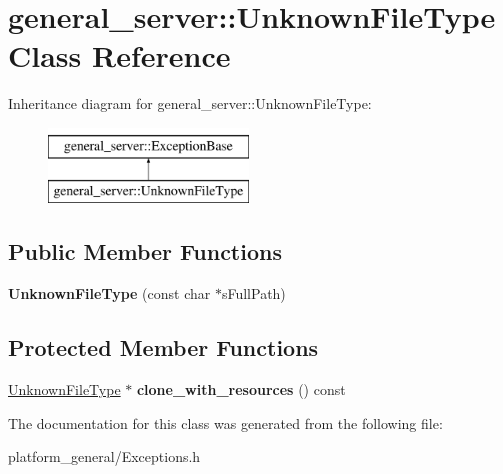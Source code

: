 \hypertarget{classgeneral__server_1_1UnknownFileType}{\section{general\-\_\-server\-:\-:\-Unknown\-File\-Type \-Class \-Reference}
\label{classgeneral__server_1_1UnknownFileType}
}
\-Inheritance diagram for general\-\_\-server\-:\-:\-Unknown\-File\-Type\-:\begin{figure}[H]
\begin{center}
\leavevmode
\includegraphics[height=2.000000cm]{classgeneral__server_1_1UnknownFileType}
\end{center}
\end{figure}
\subsection*{\-Public \-Member \-Functions}
\begin{DoxyCompactItemize}
\item 
\hypertarget{classgeneral__server_1_1UnknownFileType_ad2e335594ff561dd2b3affd301761854}{{\bfseries \-Unknown\-File\-Type} (const char $\ast$s\-Full\-Path)}\label{classgeneral__server_1_1UnknownFileType_ad2e335594ff561dd2b3affd301761854}

\end{DoxyCompactItemize}
\subsection*{\-Protected \-Member \-Functions}
\begin{DoxyCompactItemize}
\item 
\hypertarget{classgeneral__server_1_1UnknownFileType_a12d5ea22c1191f9a631e34048e14476b}{\hyperlink{classgeneral__server_1_1UnknownFileType}{\-Unknown\-File\-Type} $\ast$ {\bfseries clone\-\_\-with\-\_\-resources} () const }\label{classgeneral__server_1_1UnknownFileType_a12d5ea22c1191f9a631e34048e14476b}

\end{DoxyCompactItemize}


\-The documentation for this class was generated from the following file\-:\begin{DoxyCompactItemize}
\item 
platform\-\_\-general/\-Exceptions.\-h\end{DoxyCompactItemize}
